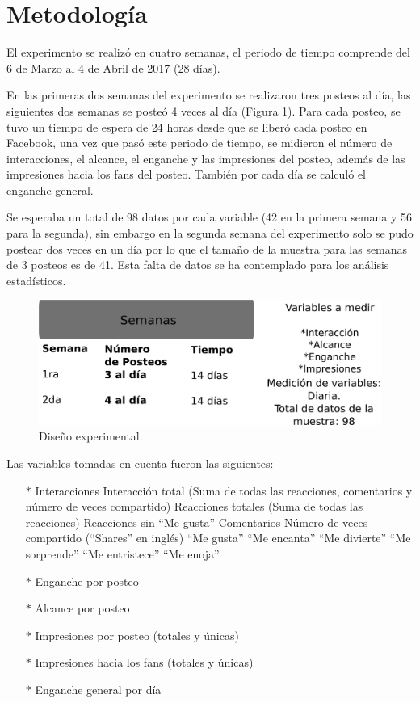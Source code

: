 \documentclass[a4paper,10pt]{article}
\begin{document}
\section{Metodología}
El experimento se realizó en cuatro semanas, el periodo de tiempo comprende del 6 de Marzo al 4 de Abril de 2017 (28 días).

En las  primeras dos  semanas del experimento se realizaron tres posteos al día,
las siguientes dos semanas se posteó 4 veces al día (Figura 1).
Para cada posteo, se tuvo un tiempo de espera de 24 horas desde que se liberó cada posteo en Facebook, 
una vez que pasó este periodo de tiempo, se midieron el número de interacciones,
el alcance, el enganche  y las impresiones del posteo, además de las impresiones hacia los fans
del posteo. 
También por cada día se calculó el enganche general.

Se esperaba un total de 98 datos por cada variable (42 en la primera semana y 56 para la segunda),
sin embargo en la segunda semana del experimento solo se pudo postear dos veces en un día por lo que 
el tamaño de la muestra para las semanas de 3 posteos es de 41. Esta falta de datos se ha contemplado para
los análisis estadísticos.

\begin{figure}[H]
  \begin{center}
   \includegraphics[width=.75\textwidth]{imagenes/dibujoExperimentoRenovado.png}
   \caption{Diseño experimental.}
  \end{center} 
\end{figure}

Las variables tomadas en cuenta fueron las siguientes:
\begin{itemize}
 \item[$*$] Interacciones
  \subitem Interacción total (Suma de todas las reacciones, comentarios y número de veces compartido)
  \subitem Reacciones totales (Suma de todas las reacciones)
  \subitem Reacciones sin ``Me gusta''
  \subitem Comentarios
  \subitem Número de veces compartido (``Shares'' en inglés)
  \subitem ``Me gusta''
  \subitem ``Me encanta''
  \subitem ``Me divierte''
  \subitem ``Me sorprende''
  \subitem ``Me entristece''
  \subitem ``Me enoja''
 \item[$*$] Enganche por posteo
 \item[$*$] Alcance por posteo
 \item[$*$] Impresiones por posteo (totales y únicas)
 \item[$*$] Impresiones hacia los fans (totales y únicas)
 \item[$*$] Enganche general por día
\end{itemize}
\end{document}
